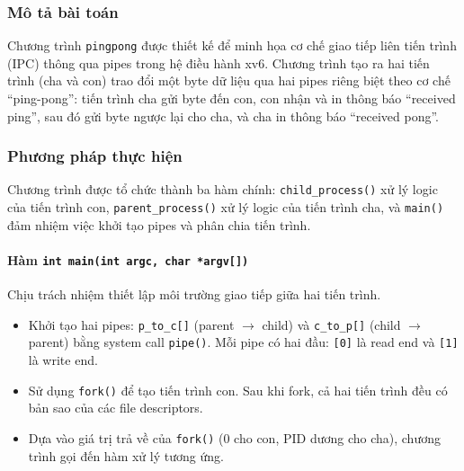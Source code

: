 \subsubsection{Mô tả bài toán}
Chương trình \texttt{pingpong} được thiết kế để minh họa cơ chế giao tiếp liên tiến trình (IPC) thông qua pipes trong hệ điều hành xv6. 
Chương trình tạo ra hai tiến trình (cha và con) trao đổi một byte dữ liệu qua hai pipes riêng biệt theo cơ chế ``ping-pong'': tiến trình cha gửi byte đến con, con nhận và in thông báo ``received ping'', sau đó gửi byte ngược lại cho cha, và cha in thông báo ``received pong''.

\subsubsection{Phương pháp thực hiện}
Chương trình được tổ chức thành ba hàm chính: \texttt{child\_process()} xử lý logic của tiến trình con, \texttt{parent\_process()} xử lý logic của tiến trình cha, và \texttt{main()} đảm nhiệm việc khởi tạo pipes và phân chia tiến trình.

\paragraph{Hàm \texttt{int main(int argc, char *argv[])}}
Chịu trách nhiệm thiết lập môi trường giao tiếp giữa hai tiến trình.
\begin{itemize}
    \item Khởi tạo hai pipes: \texttt{p\_to\_c[]} (parent $\rightarrow$ child) và \texttt{c\_to\_p[]} (child $\rightarrow$ parent) bằng system call \texttt{pipe()}. Mỗi pipe có hai đầu: \texttt{[0]} là read end và \texttt{[1]} là write end.
    \item Sử dụng \texttt{fork()} để tạo tiến trình con. Sau khi fork, cả hai tiến trình đều có bản sao của các file descriptors.
    \item Dựa vào giá trị trả về của \texttt{fork()} (0 cho con, PID dương cho cha), chương trình gọi đến hàm xử lý tương ứng.
\end{itemize}

